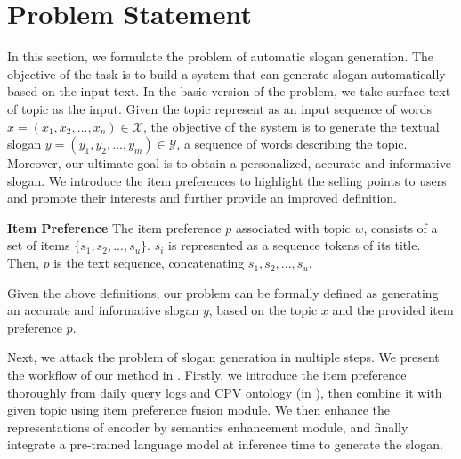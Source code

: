 \section{Problem Statement}
\label{sec:problem}
In this section, we formulate the problem of automatic slogan generation.
The objective of the task is to build a system
that can generate slogan automatically based on the
input text.
In the basic version of the problem,
we take surface text of topic as the input.
Given the topic represent as an input sequence of words
$x = (x_1, x_2, ..., x_n) \in \mathcal{X} $,
the objective of the system is to generate the textual slogan
$y = (y_1, y_2, ..., y_m) \in \mathcal{Y}$,
a sequence of words describing the topic.
Moreover, our ultimate goal is to obtain a personalized,
accurate and informative slogan.
We introduce the item preferences to
highlight the selling points to users and promote their interests
and further provide an improved definition.


\theoremstyle{definition}
\begin{definition}
	\label{item_preference}
	\textbf{Item Preference}
	The item preference $p$ associated with topic $w$,
	consists of a set of items 
	$\{s_1, s_2, ..., s_u\}$. 
	$s_i$ is represented as a sequence tokens of its title.
	Then, $p$ is the text sequence, concatenating $s_1, s_2, ..., s_u$.
\end{definition}

Given the above definitions, our problem
can be formally defined as generating an accurate and informative
slogan $y$, based on the topic $x$ and the provided item preference
$p$.

Next, we attack the problem of slogan generation in multiple steps. 
We present the workflow of our method in .
Firstly, we introduce the item preference thoroughly from 
daily query logs and CPV ontology (in ),
then combine it with given topic using item preference fusion module.
We then enhance the representations of encoder by semantics enhancement 
module, and finally integrate a pre-trained language model
at inference time to generate the slogan.

